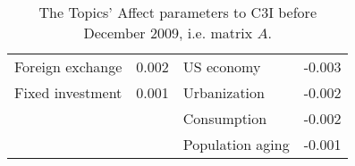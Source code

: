\documentclass[10pt]{article}
\begin{document}
\begin {table}
\begin {center}
\begin {tabular} {llll}
Foreign exchange	         &	0.002	                                 &	US economy	                          &	-0.003	\\
Fixed investment	         &	0.001	                                 &	Urbanization	                           &	-0.002	\\
	                                  &		                                         &	Consumption	                           &	-0.002	\\
	                                   &		                                          &	Population aging	                  &	-0.001	\\\hline                  
 \end {tabular}
 \caption{The Topics' Affect parameters to C3I before December 2009, i.e. matrix $A$.}
 \label{matrixA}
 \end{center}
 \end {table}
\end{document}
